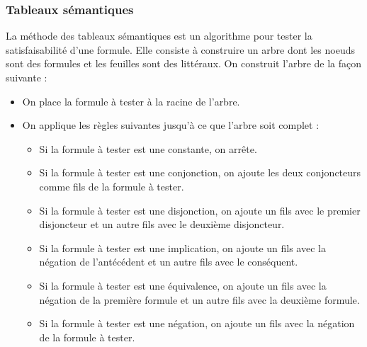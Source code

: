 \documentclass[a4paper, 12pt]{extarticle}
\begin{document}
\subsubsection{Tableaux sémantiques}
La méthode des tableaux sémantiques est un algorithme pour tester la satisfaisabilité d'une formule. Elle consiste à construire un arbre dont les noeuds sont des formules et les feuilles sont des littéraux. On construit l'arbre de la façon suivante :
\begin{itemize}[label=$\bullet$]
  \item On place la formule à tester à la racine de l'arbre.
  \item On applique les règles suivantes jusqu'à ce que l'arbre soit complet :
  \begin{itemize}[label=$\circ$]
    \item Si la formule à tester est une constante, on arrête.
    \item Si la formule à tester est une conjonction, on ajoute les deux conjoncteurs comme fils de la formule à tester.
    \item Si la formule à tester est une disjonction, on ajoute un fils avec le premier disjoncteur et un autre fils avec le deuxième disjoncteur.
    \item Si la formule à tester est une implication, on ajoute un fils avec la négation de l'antécédent et un autre fils avec le conséquent.
    \item Si la formule à tester est une équivalence, on ajoute un fils avec la négation de la première formule et un autre fils avec la deuxième formule.
    \item Si la formule à tester est une négation, on ajoute un fils avec la négation de la formule à tester.
  \end{itemize}
\end{itemize}










\end{document}
